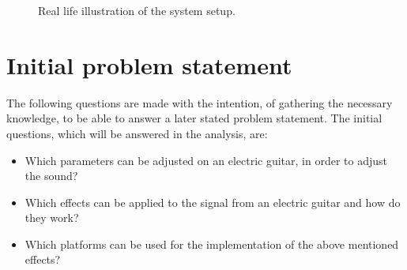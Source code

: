 
\begin{figure}
\centering
\def\svgwidth{\columnwidth}
\scalebox{0.7}{}
\caption{Real life illustration of the system setup.}
		\label{fig:real_life_drawing}
\end{figure}

\section{Initial problem statement}
The following questions are made with the intention, of gathering the necessary knowledge, to be able to answer a later stated problem statement. The initial questions, which will be answered in the analysis, are:

\begin{itemize}
\item Which parameters can be adjusted on an electric guitar, in order to adjust the sound?
\item Which effects can be applied to the signal from an electric guitar and how do they work?
\item Which platforms can be used for the implementation of the above mentioned effects? 
\end{itemize}